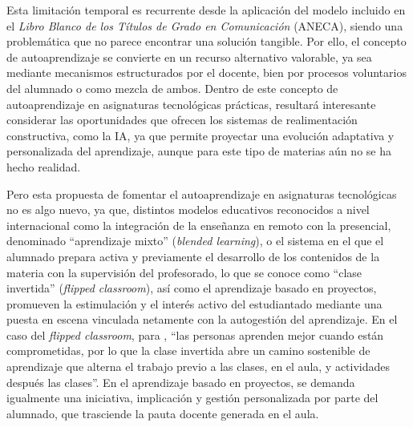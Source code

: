 \documentclass[spanish]{textolivre}
\begin{document}
Esta limitación temporal es recurrente desde la aplicación del modelo incluido en el \textit{Libro Blanco de los Títulos de Grado en Comunicación} \cite{agencia_nacional_de_evaluacion_de_la_calidad_y_acreditacion_titulos_2005} (ANECA), siendo una problemática que no parece encontrar una solución tangible. Por ello, el concepto de autoaprendizaje se convierte en un recurso alternativo valorable, ya sea mediante mecanismos estructurados por el docente, bien por procesos voluntarios del alumnado o como mezcla de ambos. Dentro de este concepto de autoaprendizaje en asignaturas tecnológicas prácticas, resultará interesante considerar las oportunidades que ofrecen los sistemas de realimentación constructiva, como la IA, ya que permite proyectar una evolución adaptativa y personalizada del aprendizaje, aunque para este tipo de materias aún no se ha hecho realidad.

Pero esta propuesta de fomentar el autoaprendizaje en asignaturas tecnológicas no es algo nuevo, ya que, distintos modelos educativos reconocidos a nivel internacional como la integración de la enseñanza en remoto con la presencial, denominado “aprendizaje mixto” (\textit{blended learning}), o el sistema en el que el alumnado prepara activa y previamente el desarrollo de los contenidos de la materia con la supervisión del profesorado, lo que se conoce como “clase invertida” (\textit{flipped classroom}), así como el aprendizaje basado en proyectos, promueven la estimulación y el interés activo del estudiantado mediante una puesta en escena vinculada netamente con la autogestión del aprendizaje. En el caso del \textit{flipped classroom}, para \textcite[307]{mejon_opiniones_2018}, “las personas aprenden mejor cuando están comprometidas, por lo que la clase invertida abre un camino sostenible de aprendizaje que alterna el trabajo previo a las clases, en el aula, y actividades después las clases”. En el aprendizaje basado en proyectos, se demanda igualmente una iniciativa, implicación y gestión personalizada por parte del alumnado, que trasciende la pauta docente generada en el aula.
\end{document}
